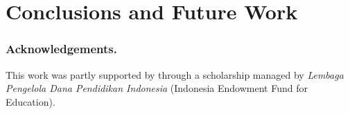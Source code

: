\documentclass{llncs}
\begin{document}
\section{Conclusions and Future Work}
\label{sec:conclusion_and_future_work}


\cite{DBLP:conf/caise/IgnatN05}

\vspace{-10pt}
\subsubsection*{Acknowledgements.} This work was partly supported by through a scholarship managed by \emph{Lembaga Pengelola Dana Pendidikan Indonesia} (Indonesia Endowment Fund for Education).

 

\end{document}

